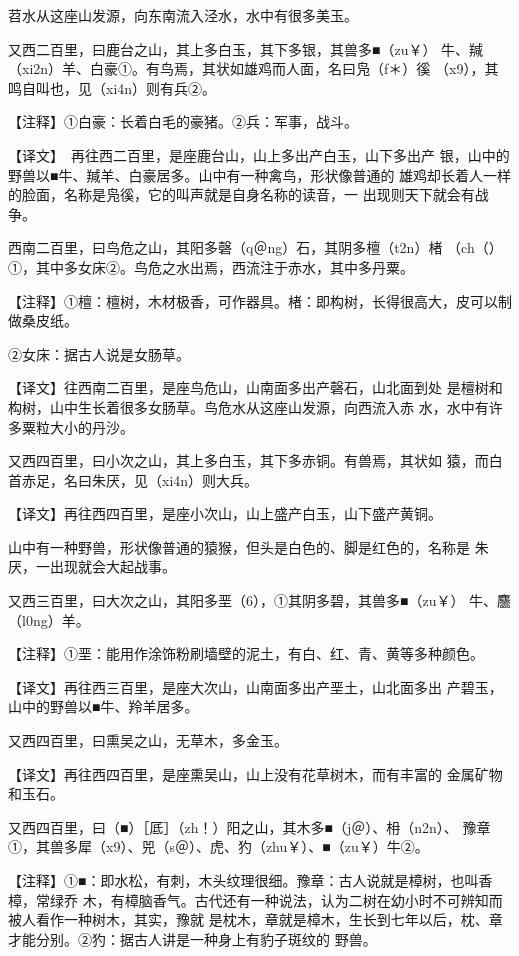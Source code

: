 \documentclass[a4paper,12pt,UTF8,twoside]{ctexbook}
\begin{document}
苕水从这座山发源，向东南流入泾水，水中有很多美玉。

又西二百里，曰鹿台之山，其上多白玉，其下多银，其兽多■（zu￥） 牛、羬（xi2n）羊、白豪①。有鸟焉，其状如雄鸡而人面，名曰凫（f＊）徯 （x9），其鸣自叫也，见（xi4n）则有兵②。

【注释】①白豪：长着白毛的豪猪。②兵：军事，战斗。

【译文】　再往西二百里，是座鹿台山，山上多出产白玉，山下多出产 银，山中的野兽以■牛、羬羊、白豪居多。山中有一种禽鸟，形状像普通的 雄鸡却长着人一样的脸面，名称是凫徯，它的叫声就是自身名称的读音，一 出现则天下就会有战争。

西南二百里，曰鸟危之山，其阳多磬（q＠ng）石，其阴多檀（t2n）楮 （ch（）①，其中多女床②。鸟危之水出焉，西流注于赤水，其中多丹粟。

【注释】①檀：檀树，木材极香，可作器具。楮：即构树，长得很高大，皮可以制做桑皮纸。

②女床：据古人说是女肠草。

【译文】往西南二百里，是座鸟危山，山南面多出产磬石，山北面到处 是檀树和构树，山中生长着很多女肠草。鸟危水从这座山发源，向西流入赤 水，水中有许多粟粒大小的丹沙。

又西四百里，曰小次之山，其上多白玉，其下多赤铜。有兽焉，其状如 猿，而白首赤足，名曰朱厌，见（xi4n）则大兵。

【译文】再往西四百里，是座小次山，山上盛产白玉，山下盛产黄铜。

山中有一种野兽，形状像普通的猿猴，但头是白色的、脚是红色的，名称是 朱厌，一出现就会大起战事。

又西三百里，曰大次之山，其阳多垩（6），①其阴多碧，其兽多■（zu￥） 牛、麢（l0ng）羊。

【注释】①垩：能用作涂饰粉刷墙壁的泥土，有白、红、青、黄等多种颜色。

【译文】再往西三百里，是座大次山，山南面多出产垩土，山北面多出 产碧玉，山中的野兽以■牛、羚羊居多。

又西四百里，曰熏吴之山，无草木，多金玉。

【译文】再往西四百里，是座熏吴山，山上没有花草树木，而有丰富的 金属矿物和玉石。

又西四百里，曰（■）［厎］（zh！）阳之山，其木多■（j＠）、枏（n2n）、 豫章①，其兽多犀（x9）、兕（s＠）、虎、犳（zhu￥）、■（zu￥）牛②。

【注释】①■：即水松，有刺，木头纹理很细。豫章：古人说就是樟树，也叫香樟，常绿乔 木，有樟脑香气。古代还有一种说法，认为二树在幼小时不可辨知而被人看作一种树木，其实，豫就 是枕木，章就是樟木，生长到七年以后，枕、章才能分别。②犳：据古人讲是一种身上有豹子斑纹的 野兽。
\end{document}
